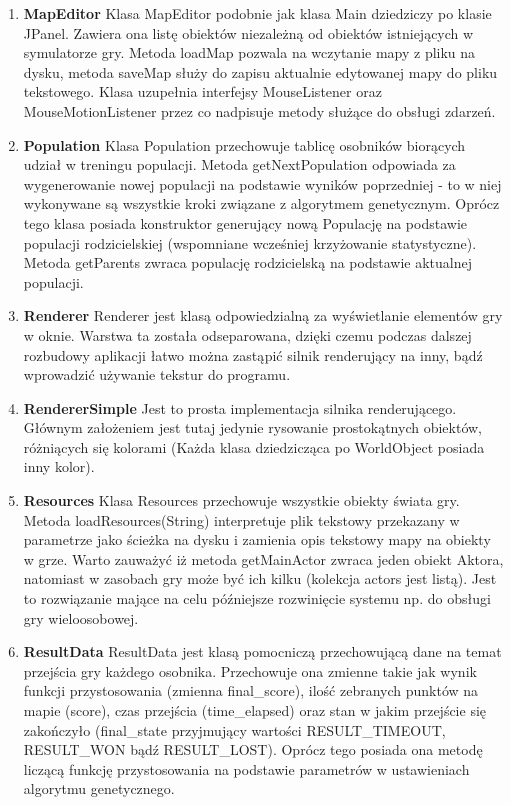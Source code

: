 \begin{par}
\begin{enumerate}
	\item{\bf MapEditor }\newline
	Klasa MapEditor podobnie jak klasa Main dziedziczy po klasie JPanel. Zawiera ona listę obiektów niezależną od obiektów istniejących w symulatorze gry. Metoda loadMap pozwala na wczytanie mapy z pliku na dysku, metoda saveMap służy do zapisu aktualnie edytowanej mapy do pliku tekstowego. Klasa uzupełnia interfejsy MouseListener oraz MouseMotionListener przez co nadpisuje metody służące do obsługi zdarzeń. 
	\item{\bf Population }\newline
	Klasa Population przechowuje tablicę osobników biorących udział w treningu populacji. 
	Metoda getNextPopulation odpowiada za wygenerowanie nowej populacji na podstawie wyników poprzedniej - to w niej wykonywane są wszystkie kroki związane z algorytmem genetycznym.
	Oprócz tego klasa posiada konstruktor generujący nową Populację na podstawie populacji rodzicielskiej (wspomniane wcześniej krzyżowanie statystyczne). Metoda getParents zwraca populację rodzicielską na podstawie aktualnej populacji.
	\item{\bf Renderer }\newline
	Renderer jest klasą odpowiedzialną za wyświetlanie elementów gry w oknie. Warstwa ta została odseparowana, dzięki czemu podczas dalszej rozbudowy aplikacji łatwo można zastąpić silnik renderujący na inny, bądź wprowadzić używanie tekstur do programu.
	\item{\bf RendererSimple }\newline
	Jest to prosta implementacja silnika renderującego. Głównym założeniem jest tutaj jedynie rysowanie prostokątnych obiektów, różniących się kolorami (Każda klasa dziedzicząca po WorldObject posiada inny kolor).
	\item{\bf Resources }\newline
	Klasa Resources przechowuje wszystkie obiekty świata gry. Metoda loadResources(String) interpretuje plik tekstowy przekazany w parametrze jako ścieżka na dysku i zamienia opis tekstowy mapy na obiekty w grze. Warto zauważyć iż metoda getMainActor zwraca jeden obiekt Aktora, natomiast w zasobach gry może być ich kilku (kolekcja actors jest listą). Jest to rozwiązanie mające na celu późniejsze rozwinięcie systemu np. do obsługi gry wieloosobowej.
	\item{\bf ResultData }\newline
	ResultData jest klasą pomocniczą przechowującą dane na temat przejścia gry każdego osobnika. Przechowuje ona zmienne takie jak wynik funkcji przystosowania (zmienna final\_score), ilość zebranych punktów na mapie (score), czas przejścia (time\_elapsed) oraz stan w jakim przejście się zakończyło (final\_state przyjmujący wartości RESULT\_TIMEOUT, RESULT\_WON bądź RESULT\_LOST). Oprócz tego posiada ona metodę liczącą funkcję przystosowania na podstawie parametrów w ustawieniach algorytmu genetycznego.

\end{enumerate}
\end{par}
